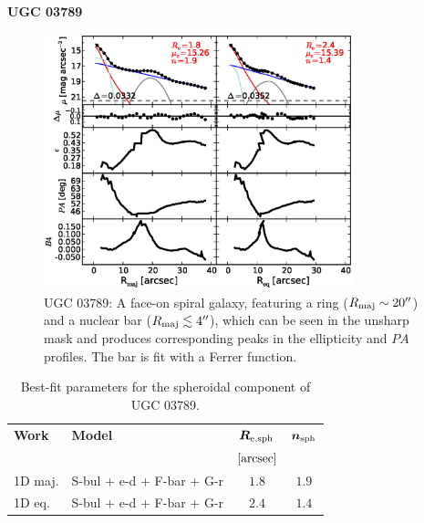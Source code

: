 \documentclass[preprint2]{emulateapj}
\newcommand{\fitfigurewidth}{0.8\textwidth}
\begin{document}
  \clearpage\newpage\noindent
  {\bf UGC 03789 \\}

  \begin{figure}[h]
  \begin{center}
  \includegraphics[width=\fitfigurewidth]{images/ugc03789_1Dfit.eps}
  \caption{UGC 03789:
  A face-on spiral galaxy, 
  featuring a ring ($R_{\rm maj} \sim 20''$) and a nuclear bar ($R_{\rm maj} \lesssim 4''$),
  which can be seen in the unsharp mask and produces corresponding peaks in the ellipticity and $PA$ profiles.
  The bar is fit with a Ferrer function.
  }
  \end{center}
  \end{figure}

  \begin{table}[h]
  \small
  \caption{Best-fit parameters for the spheroidal component of UGC 03789.}
  \begin{center}
  \begin{tabular}{llcc}
  \hline
  {\bf Work} & {\bf Model}   & $\bm R_{\rm e,sph}$    & $\bm n_{\rm sph}$ \\
    &  &  $[\rm arcsec]$ & \\
  \hline
  1D maj. & S-bul + e-d + F-bar + G-r & $1.8$  &  $1.9$ \\
  1D eq.  & S-bul + e-d + F-bar + G-r & $2.4$  &  $1.4$ \\
  \hline
  \end{tabular}
  \end{center}
  \label{tab:ugc3789}
  \end{table}
\end{document}
